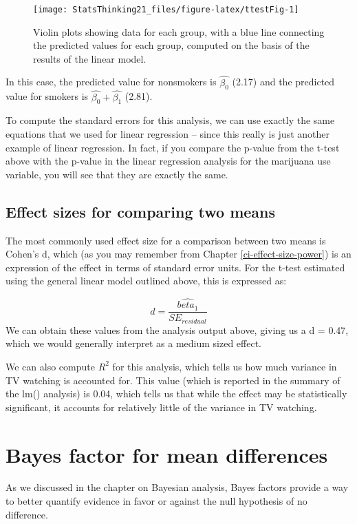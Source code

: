\documentclass[]{book}
\theoremstyle{definition}
\theoremstyle{definition}
\theoremstyle{definition}
\theoremstyle{remark}
\begin{document}
\begin{figure}
\texttt{[image: StatsThinking21\_files/figure-latex/ttestFig-1]} \caption{Violin plots showing data for each group, with a blue line connecting the predicted values for each group, computed on the basis of the results of the linear model.}\label{fig:ttestFig}
\end{figure}

In this case, the predicted value for nonsmokers is \(\hat{\beta_0}\)
(2.17) and the predicted value for smokers is
\(\hat{\beta_0} +\hat{\beta_1}\) (2.81).

To compute the standard errors for this analysis, we can use exactly the
same equations that we used for linear regression -- since this really
is just another example of linear regression. In fact, if you compare
the p-value from the t-test above with the p-value in the linear
regression analysis for the marijuana use variable, you will see that
they are exactly the same.

\subsection{Effect sizes for comparing two
means}\label{effect-sizes-for-comparing-two-means}

The most commonly used effect size for a comparison between two means is
Cohen's d, which (as you may remember from Chapter
\ref{ci-effect-size-power}) is an expression of the effect in terms of
standard error units. For the t-test estimated using the general linear
model outlined above, this is expressed as:

\[
d = \frac{\hat{beta_1}}{SE_{residual}}
\] We can obtain these values from the analysis output above, giving us
a d = 0.47, which we would generally interpret as a medium sized effect.

We can also compute \(R^2\) for this analysis, which tells us how much
variance in TV watching is accounted for. This value (which is reported
in the summary of the lm() analysis) is 0.04, which tells us that while
the effect may be statistically significant, it accounts for relatively
little of the variance in TV watching.

\section{Bayes factor for mean
differences}\label{bayes-factor-for-mean-differences}

As we discussed in the chapter on Bayesian analysis, Bayes factors
provide a way to better quantify evidence in favor or against the null
hypothesis of no difference.
\end{document}
